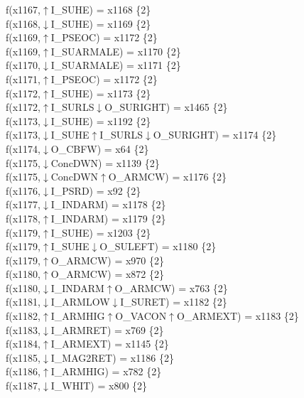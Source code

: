 f(x1167,$\uparrow$I\_SUHE) = x1168 \{2\} \\  
f(x1168,$\downarrow$I\_SUHE) = x1169 \{2\} \\  
f(x1169,$\uparrow$I\_PSEOC) = x1172 \{2\} \\  
f(x1169,$\uparrow$I\_SUARMALE) = x1170 \{2\} \\  
f(x1170,$\downarrow$I\_SUARMALE) = x1171 \{2\} \\  
f(x1171,$\uparrow$I\_PSEOC) = x1172 \{2\} \\  
f(x1172,$\uparrow$I\_SUHE) = x1173 \{2\} \\  
f(x1172,$\uparrow$I\_SURLS$\downarrow$O\_SURIGHT) = x1465 \{2\} \\  
f(x1173,$\downarrow$I\_SUHE) = x1192 \{2\} \\  
f(x1173,$\downarrow$I\_SUHE$\uparrow$I\_SURLS$\downarrow$O\_SURIGHT) = x1174 \{2\} \\  
f(x1174,$\downarrow$O\_CBFW) = x64 \{2\} \\  
f(x1175,$\downarrow$ConcDWN) = x1139 \{2\} \\  
f(x1175,$\downarrow$ConcDWN$\uparrow$O\_ARMCW) = x1176 \{2\} \\  
f(x1176,$\downarrow$I\_PSRD) = x92 \{2\} \\  
f(x1177,$\downarrow$I\_INDARM) = x1178 \{2\} \\  
f(x1178,$\uparrow$I\_INDARM) = x1179 \{2\} \\  
f(x1179,$\uparrow$I\_SUHE) = x1203 \{2\} \\  
f(x1179,$\uparrow$I\_SUHE$\downarrow$O\_SULEFT) = x1180 \{2\} \\  
f(x1179,$\uparrow$O\_ARMCW) = x970 \{2\} \\  
f(x1180,$\uparrow$O\_ARMCW) = x872 \{2\} \\  
f(x1180,$\downarrow$I\_INDARM$\uparrow$O\_ARMCW) = x763 \{2\} \\  
f(x1181,$\downarrow$I\_ARMLOW$\downarrow$I\_SURET) = x1182 \{2\} \\  
f(x1182,$\uparrow$I\_ARMHIG$\uparrow$O\_VACON$\uparrow$O\_ARMEXT) = x1183 \{2\} \\  
f(x1183,$\downarrow$I\_ARMRET) = x769 \{2\} \\  
f(x1184,$\uparrow$I\_ARMEXT) = x1145 \{2\} \\  
f(x1185,$\downarrow$I\_MAG2RET) = x1186 \{2\} \\  
f(x1186,$\uparrow$I\_ARMHIG) = x782 \{2\} \\  
f(x1187,$\downarrow$I\_WHIT) = x800 \{2\} \\  
